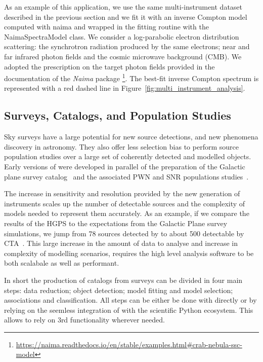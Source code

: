 \documentclass[traditabstract, longauth]{aa}
\begin{document}
As an example of this application, we use the same multi-instrument
dataset described in the previous section and we fit it with an inverse
Compton model computed with naima and wrapped in the \gammapy fitting
 routine with the NaimaSpectraModel class. We consider a log-parabolic
electron distribution scattering: the synchrotron radiation produced by
the same electrons; near and far infrared photon fields and the cosmic
microwave background (CMB). We adopted the prescription on the target
photon fields provided in the
documentation of the \textit{Naima} package \footnote{\url{https://naima.readthedocs.io/en/stable/examples.html\#crab-nebula-ssc-model}}.
The best-fit inverse Compton spectrum is represented with a red dashed line in
Figure~\ref{fig:multi_instrument_analysis}.

\subsection{Surveys, Catalogs, and Population Studies}
\label{ssec:surveys-catalogs-and-population-studies}

Sky surveys have a large potential for new source detections, and new phenomena
discovery in \gammaray astronomy. They also offer less selection bias to perform
source population studies over a large set of coherently detected and modelled objects.
Early versions of \gammapy were developed in parallel of the preparation of
the \hess Galactic plane survey catalog~\citep[HGPS, ][]{2018A&A...612A...1H} and
the associated PWN and SNR populations studies~\citep{2018A&A...612A...2H,
	2018A&A...612A...3H}. 

The increase in sensitivity and resolution provided by the new generation of
instruments scales up the number of detectable sources and the complexity of 
models needed to represent them accurately. As an example, if we compare the
results of the HGPS to the expectations from the \cta Galactic Plane survey
simulations, we jump from 78 sources detected by \hess to about 500 detectable by
CTA~\citep{2021arXiv210903729R}. This large increase in the amount of data to analyse
and increase in complexity of modelling scenarios, requires the high level
analysis software to be both scalabale as well as performant. 

In short the production of catalogs from \gammaray surveys can be divided in
four main steps: data reduction; object detection; model fitting and model
selection; associations and classification. All steps can be either be done
with \gammapy directly or by relying on the seemless integration 
of \gammapy with the scientific Python ecosystem. This allows to rely
on 3rd functionality wherever needed.
\end{document}
